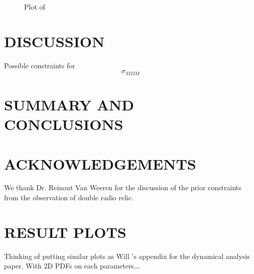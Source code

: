 \documentclass[useAMS,usenatbib]{mn2e}
\begin{document}
\begin{figure}
  \vspace*{174pt}
  \caption{Plot of }
\end{figure}

%
\begin{figure*}
\end{figure*}


\section{DISCUSSION}
Possible constraints for \[\sigma_{SIDM}\]
\section{SUMMARY AND CONCLUSIONS}


\section*{ACKNOWLEDGEMENTS}
We thank Dr. Reinout Van Weeren for the discussion of the prior constraints from 
the observation of double radio relic.

\begin{thebibliography}{99}

\end{thebibliography}

\appendix

\section{RESULT PLOTS}
Thinking of putting similar plots as Will 's appendix for the dynamical analysis paper.
With 2D PDFs on each parameters\ldots.





\bsp

\label{lastpage}
\end{document}
